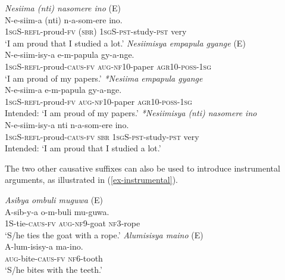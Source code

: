 \documentclass[output=paper,colorlinks,citecolor=brown,draftmode]{langscibook}
\begin{document}
\ea
\begin{xlist}   \label{ex:Saebo:proud}
 \ex \label{ex:Saebo:proudA} \emph{Nesiima (nti) nasomere ino} (E) \\
  \gll  N-e-siim-a (nti) n-a-som-ere ino. \\ 
\textsc{1sg}S-\textsc{refl}-proud-\textsc{fv} (\textsc{sbr}) \textsc{1sg}S-\textsc{pst}-study-\textsc{pst} very \\
    \glt  `I am proud that I studied a lot.' 
 \ex \label{ex:Saebo:proudB} \emph{Nesiimisya empapula gyange} (E) \\
  \gll N-e-siim-isy-a e-m-papula gy-a-nge. \\ 
\textsc{1sg}S-\textsc{refl}-proud-\textsc{caus-fv} \textsc{aug-nf10}-paper \textsc{agr10-poss-1sg}\\
    \glt  `I am proud of my papers.' 
     \ex \label{ex:Saebo:proudC} \emph{*Nesiima empapula gyange} \\
  \gll N-e-siim-a e-m-papula gy-a-nge. \\
  \textsc{1sg}S-\textsc{refl}-proud-\textsc{fv} \textsc{aug-nf10}-paper \textsc{agr10-poss-1sg}\\ 
    \glt  Intended: `I am proud of my papers.' 
 \ex \label{ex:Saebo:proudD} \emph{*Nesiimisya (nti) nasomere ino} \\
  \gll  N-e-siim-isy-a nti n-a-som-ere ino. \\ 
\textsc{1sg}S-\textsc{refl}-proud-\textsc{caus-fv} \textsc{sbr} \textsc{1sg}S-\textsc{pst}-study-\textsc{pst} very \\
    \glt  Intended: `I am proud that I studied a lot.' 
      \end{xlist}     
      \z

The two other causative suffixes can also be used to introduce instrumental arguments, as illustrated in (\ref{ex-instrumental}). 

\ea
\begin{xlist}   \label{ex-instrumental}
 \ex \emph{Asibya ombuli muguwa} (E) \\
  \gll A-sib-y-a 		o-m-buli 		mu-guwa. \\ 
1S-tie-\textsc{caus-fv} \textsc{aug-nf9}-goat \textsc{nf3}-rope  \\
    \glt  `S/he ties the goat with a rope.' 
 \ex \emph{Alumisisya 	maino} (E) \\
  \gll  A-lum-isisy-a 		ma-ino. \\ 
\textsc{aug}-bite-\textsc{caus-fv} \textsc{nf6}-tooth\\
    \glt  `S/he bites with the teeth.' 
      \end{xlist}     
      \z
\end{document}
